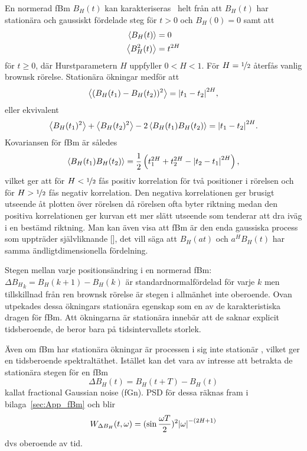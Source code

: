 En normerad fBm $B_H(t)$ kan karakteriseras~\cite{Dieker_fBm} helt från att $B_H(t)$ har stationära och gaussiskt fördelade steg för $t>0$ och $B_H(0)=0$ samt att
\begin{equation}
\begin{aligned}
    \ev{B_H(t)}&=0 \\
    \ev{B^2_H(t)}&=t^{2H}
\end{aligned}
\end{equation}
för $t\geq 0$, där Hurstparametern $H$ uppfyller $0< H <1$. För $H=\nicefrac{1}{2}$ återfås vanlig brownsk rörelse. Stationära ökningar medför att 
\begin{equation}
    \ev{(B_H(t_1)-B_H(t_2))^2} = \abs{t_1-t_2}^{2H},
\end{equation}
eller ekvivalent
\begin{equation}
    \ev{B_H(t_1)^2}+\ev{B_H(t_2)^2}-2\ev{B_H(t_1)B_H(t_2)} = \abs{t_1-t_2}^{2H}.
\end{equation}
Kovariansen för fBm är således
\begin{equation}
\ev{B_H(t_1)B_H(t_2)}
= \frac{1}{2} \left(t_1^{2H}+t_2^{2H}-\abs{t_2-t_1}^{2H}\right),
\end{equation} 
vilket ger att för $H<\nicefrac{1}{2}$ fås positiv korrelation för två positioner i rörelsen och för  $H>\nicefrac{1}{2}$ fås negativ korrelation. Den negativa korrelationen ger brusigt utseende åt plotten över rörelsen då rörelsen ofta byter riktning medan den positiva korrelationen ger kurvan ett mer slätt utseende som tenderar att dra iväg i en bestämd riktning. Man kan även visa att fBm är den enda gaussiska process som uppträder självliknande [], det vill säga att $B_H(at)$ och $a^H B_H(t)$ har samma ändligtdimensionella fördelning.

Stegen mellan varje positionsändring i en normerad fBm:  $\Delta{B_H}_k=B_H(k+1)-B_H(k)$ är standardnormalfördelad för varje $k$ men tillskillnad från ren brownsk rörelse är stegen i allmänhet inte oberoende. Ovan utpekades dessa ökningars stationära egenskap som en av de karakteristiska dragen för fBm. Att ökningarna är stationära innebär att de saknar explicit tidsberoende, de beror bara på tidsintervallets storlek.

Även om fBm har stationära ökningar är processen i sig inte stationär \cite{Flandrin_fBmspektrum1989}, vilket ger en tidsberoende spektraltäthet. Istället kan det vara av intresse att betrakta de stationära stegen för en fBm
\begin{equation}
    \Delta{B_H}(t)=B_H(t+T)-B_H(t)
\end{equation} 
kallat fractional Gaussian noise (fGn). PSD för dessa räknas fram i bilaga~\ref{sec:App_fBm} och blir
\begin{equation}
    W_{\Delta{B_H}}(t,\omega)=(\sin{\frac{\omega T}{2}})^2 \abs{\omega}^{-(2H+1)}
\end{equation}
dvs oberoende av tid.
    



